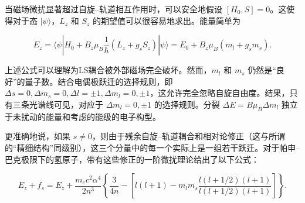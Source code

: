 \documentclass[dvipsnames, svgnames,a4paper,11pt]{article}
\begin{document}
	当磁场微扰显著超过自旋–轨道相互作用时，可以安全地假设 $[H_0, S] = 0$。这使得对于态 $|\psi\rangle$，$L_z$ 和 $S_z$ 的期望值可以很容易地求出。能量简单为
	
	$$
	E_z = \langle \psi | H_0 + B_z \mu_B \frac{1}{\hbar} (L_z + g_s S_z) | \psi \rangle = E_0 + B_z \mu_B (m_l + g_s m_s).
	$$
	
	上述公式可以理解为LS耦合被外部磁场完全破坏。然而，$m_l$ 和 $m_s$ 仍然是“良好”的量子数。结合电偶极跃迁的选择规则，即 $\Delta s = 0, \Delta m_s = 0, \Delta l = \pm 1, \Delta m_l = 0, \pm 1$，这允许完全忽略自旋自由度。结果，只有三条光谱线可见，对应于 $\Delta m_l = 0, \pm 1$ 的选择规则。分裂 $\Delta E = B \mu_B \Delta m_l$ 独立于未扰动的能量和考虑的能级的电子构型。
	
	更准确地说，如果 $s \neq 0$，则由于残余自旋–轨道耦合和相对论修正（这与所谓的“精细结构”同级别），这三个分量中的每一个实际上是一组若干跃迁。对于帕申–巴克极限下的氢原子，带有这些修正的一阶微扰理论给出了以下公式：
	
	$$
	E_z + f_s = E_z + \frac{m_e c^2 \alpha^4}{2n^3} \left\{ \frac{3}{4n} - \left[ l(l + 1) - m_l m_s \frac{l (l + 1/2) (l + 1)}{l (l + 1/2) (l + 1)} \right] \right\}.
	$$
	
	\begin{table}[h!]
		\centering
	\end{table}
	
\end{document}

